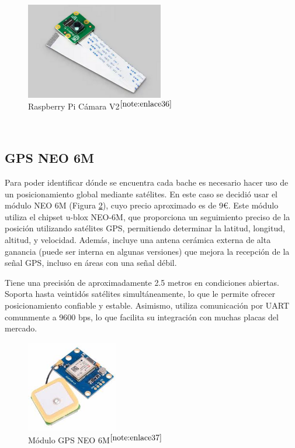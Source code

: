 \begin{figure} [h!]
	\begin{center}
		\includegraphics[width=6cm]{figs/campi.png}
	\end{center}
	\caption{Raspberry Pi Cámara V2$^{\ref{note:enlace36}}$} 
\label{fig:raspberrycam}
\end{figure}\

\setcounter{footnote}{36} %

\subsection{GPS NEO 6M}

Para poder identificar dónde se encuentra cada bache es necesario hacer uso de un posicionamiento global mediante satélites. En este caso se decidió usar el módulo NEO 6M (Figura \ref{fig:gps}), cuyo precio aproximado es de 9€. Este módulo utiliza el chipset u-blox NEO-6M, que proporciona un seguimiento preciso de la posición utilizando satélites \acs{GPS}, permitiendo determinar la latitud, longitud, altitud, y velocidad. Además, incluye una antena cerámica externa de alta ganancia (puede ser interna en algunas versiones) que mejora la recepción de la señal \acs{GPS}, incluso en áreas con una señal débil.

Tiene una precisión de aproximadamente 2.5 metros en condiciones abiertas. Soporta hasta veintidós satélites simultáneamente, lo que le permite ofrecer posicionamiento confiable y estable. Asimismo, utiliza comunicación por \ac{UART} comunmente a 9600 bps, lo que facilita su integración con muchas placas del mercado.

\begin{figure} [h!]
	\begin{center}
		\includegraphics[width=4cm]{figs/GPSNEO6MV2.jpeg}
	\end{center}
	\caption{Módulo GPS NEO 6M$^{\ref{note:enlace37}}$} 
\label{fig:gps}
\end{figure}\

